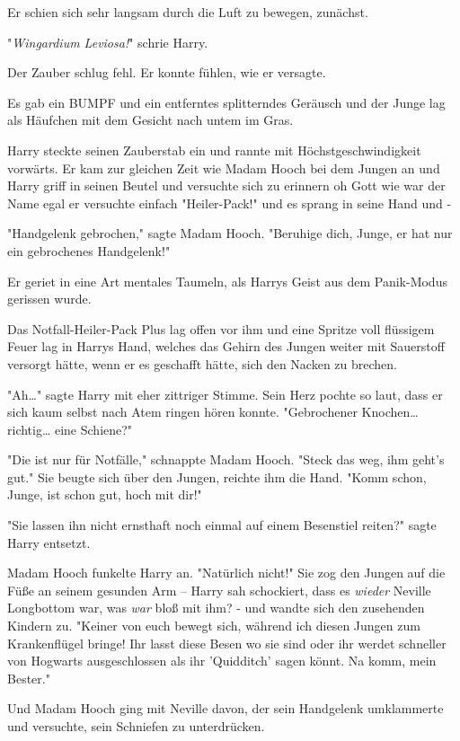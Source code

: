 {Er schien sich sehr langsam durch die Luft zu bewegen, zunächst.

"\emph{Wingardium Leviosa!}" schrie Harry.

Der Zauber schlug fehl. Er konnte fühlen, wie er versagte.

Es gab ein BUMPF und ein entferntes splitterndes Geräusch und der Junge lag als Häufchen mit dem Gesicht nach untem im Gras.

Harry steckte seinen Zauberstab ein und rannte mit Höchstgeschwindigkeit vorwärts. Er kam zur gleichen Zeit wie Madam Hooch bei dem Jungen an und Harry griff in seinen Beutel und versuchte sich zu erinnern oh Gott wie war der Name egal er versuchte einfach "Heiler-Pack!" und es sprang in seine Hand und -

"Handgelenk gebrochen," sagte Madam Hooch. "Beruhige dich, Junge, er hat nur ein gebrochenes Handgelenk!"

Er geriet in eine Art mentales Taumeln, als Harrys Geist aus dem Panik-Modus gerissen wurde.

Das Notfall-Heiler-Pack Plus lag offen vor ihm und eine Spritze voll flüssigem Feuer lag in Harrys Hand, welches das Gehirn des Jungen weiter mit Sauerstoff versorgt hätte, wenn er es geschafft hätte, sich den Nacken zu brechen.

"Ah…" sagte Harry mit eher zittriger Stimme. Sein Herz pochte so laut, dass er sich kaum selbst nach Atem ringen hören konnte. "Gebrochener Knochen… richtig… eine Schiene?"

"Die ist nur für Notfälle," schnappte Madam Hooch. "Steck das weg, ihm geht's gut." Sie beugte sich über den Jungen, reichte ihm die Hand. "Komm schon, Junge, ist schon gut, hoch mit dir!"

"Sie lassen ihn nicht ernsthaft noch einmal auf einem Besenstiel reiten?" sagte Harry entsetzt.

Madam Hooch funkelte Harry an. "Natürlich nicht!" Sie zog den Jungen auf die Füße an seinem gesunden Arm -- Harry sah schockiert, dass es \emph{wieder} Neville Longbottom war, was \emph{war} bloß mit ihm? - und wandte sich den zusehenden Kindern zu. "Keiner von euch bewegt sich, während ich diesen Jungen zum Krankenflügel bringe! Ihr lasst diese Besen wo sie sind oder ihr werdet schneller von Hogwarts ausgeschlossen als ihr 'Quidditch' sagen könnt. Na komm, mein Bester."

Und Madam Hooch ging mit Neville davon, der sein Handgelenk umklammerte und versuchte, sein Schniefen zu unterdrücken.

}
